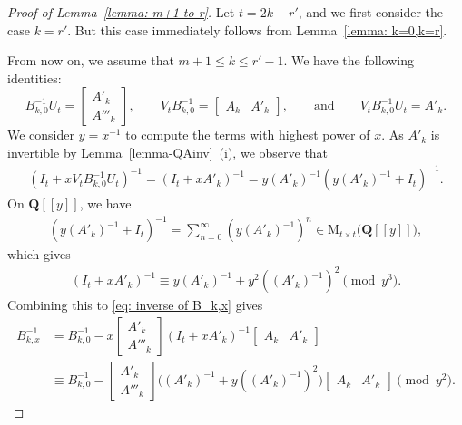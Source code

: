 \documentclass[11pt]{amsart}
\theoremstyle{definition}
\numberwithin{equation}{subsection}
\theoremstyle{plain}
\theoremstyle{plain}
\theoremstyle{plain}
\theoremstyle{plain}
\theoremstyle{plain}
\theoremstyle{plain}
\theoremstyle{plain}
\theoremstyle{plain}
\theoremstyle{plain}
\theoremstyle{plain}
\theoremstyle{plain}
\theoremstyle{plain}
\theoremstyle{definition}
\theoremstyle{definition}
\theoremstyle{definition}
\theoremstyle{remark}
\renewcommand{\(}{\textup{(}}
\renewcommand{\)}{\textup{)}}
\newcommand{\M}{\mathrm{M}}
\newcommand{\Q}{\mathbf{Q}}
\begin{document}
\begin{proof}[Proof of Lemma~\ref{lemma: m+1 to r}]
Let $t=2k-r'$, and we first consider the case $k=r'$. But this case immediately follows from Lemma~\ref{lemma: k=0,k=r}.




From now on, we assume that $m+1\leq k\leq r'-1$. We have the following identities:
$$B_{k,0}^{-1}U_t
=
        \begin{bmatrix}
          A'_k \\
          A'''_k
        \end{bmatrix},
\qquad
    V_tB_{k,0}^{-1}
        =
        \begin{bmatrix}
          A_k & A'_k
        \end{bmatrix},
\qquad\mbox{and}\qquad
    V_tB_{k,0}^{-1}U_t
        =A'_k.$$
We consider $y=x^{-1}$ to compute the terms with highest power of $x$. As $A'_k$ is invertible by Lemma~\ref{lemma-QAinv}~(i), we observe that
    \begin{align*}
        (I_t+xV_tB_{k,0}^{-1}U_t)^{-1}
        =
        (I_t+xA'_k)^{-1}
        =y(A'_k)^{-1}(y(A'_k)^{-1}+I_t)^{-1}.
    \end{align*}
    On $\Q[[y]]$, we have
    \begin{align*}
        (y(A'_k)^{-1}+I_t)^{-1}
        =\sum_{n=0}^\infty (y(A'_k)^{-1})^n
        \in \M_{t\times t}\big( \Q[[y]] \big),
    \end{align*}
    which gives
    \begin{align*}
        (I_t+xA'_k)^{-1}
        \equiv
        y(A'_k)^{-1}+y^2((A'_k)^{-1})^2 \pmod{y^3}.
    \end{align*}
Combining this to \eqref{eq: inverse of B_k,x} gives
    \begin{align*}
        B_{k,x}^{-1}
        &=
        B_{k,0}^{-1}
        -x
        \begin{bmatrix}
            A'_k \\
            A'''_k
        \end{bmatrix}
        (I_t+xA'_k)^{-1}
        \begin{bmatrix}
            A_k & A'_k
        \end{bmatrix}
        \\
        &\equiv
        B_{k,0}^{-1}
        -
        \begin{bmatrix}
            A'_k \\
            A'''_k
        \end{bmatrix}
        \big((A'_k)^{-1}+y((A'_k)^{-1})^2\big)
        \begin{bmatrix}
            A_k & A'_k
        \end{bmatrix}
        \pmod{y^2}.
    \end{align*}


\end{proof}
\end{document}
